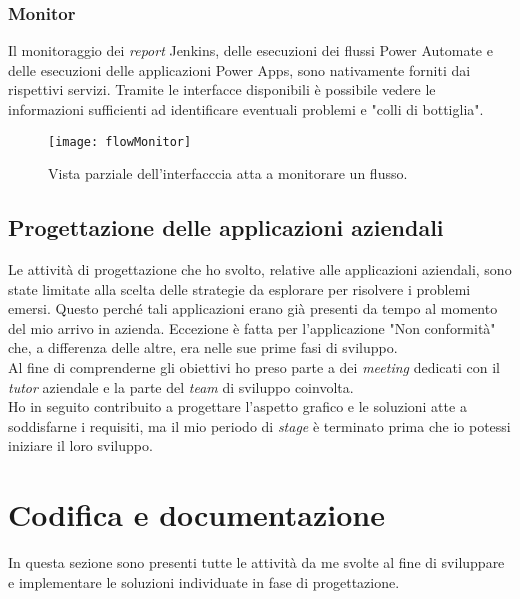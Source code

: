 \subsubsection*{Monitor}
Il monitoraggio dei \emph{report} Jenkins, delle esecuzioni dei flussi Power Automate e delle esecuzioni delle applicazioni Power Apps, sono nativamente forniti dai rispettivi servizi.
Tramite le interfacce disponibili è possibile vedere le informazioni sufficienti ad identificare eventuali problemi e "colli di bottiglia".
\begin{figure}[htbp] 
    \centering 
    \texttt{[image: flowMonitor]} 
    \caption{Vista parziale dell'interfacccia atta a monitorare un flusso.}
    \label{fig:flowMonitor}
\end{figure}

\newpage \subsection{Progettazione delle applicazioni aziendali}
Le attività di progettazione che ho svolto, relative alle applicazioni aziendali, sono state limitate alla scelta delle strategie da esplorare per risolvere i problemi emersi.
Questo perché tali applicazioni erano già presenti da tempo al momento del mio arrivo in azienda.
Eccezione è fatta per l'applicazione "Non conformità" che, a differenza delle altre, era nelle sue prime fasi di sviluppo.\\
Al fine di comprenderne gli obiettivi ho preso parte a dei \emph{meeting} dedicati con il \emph{\emph{tutor}} aziendale e la parte del \emph{team} di sviluppo coinvolta.\\ 
Ho in seguito contribuito a progettare l'aspetto grafico e le soluzioni atte a soddisfarne i requisiti, ma il mio periodo di \emph{stage} è terminato prima che io potessi iniziare il loro sviluppo.  

\section{Codifica e documentazione}
In questa sezione sono presenti tutte le attività da me svolte al fine di sviluppare e implementare le soluzioni individuate in fase di progettazione.
